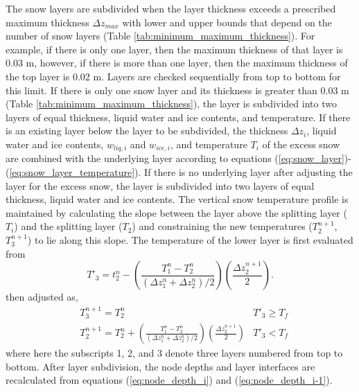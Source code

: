 \documentclass[12pt,authoryear]{elsarticle}
\numberwithin{equation}{section} %
\begin{document}
%
The snow layers are subdivided when the layer thickness exceeds a prescribed maximum thickness $\Delta z_{max}$ with lower and upper bounds that depend on the number of snow layers (Table \ref{tab:minimum_maximum_thickness}). For example, if there is only one layer, then the maximum thickness of that layer is 0.03 m, however, if there is more than one layer, then the maximum thickness of the top layer is 0.02 m. Layers are checked sequentially from top to bottom for this limit. If there is only one snow layer and its thickness is greater than 0.03 m (Table \ref{tab:minimum_maximum_thickness}), the layer is subdivided into two layers of equal thickness, liquid water and ice contents, and temperature. If there is an existing layer below the layer to be subdivided, the thickness $\Delta z_{i}$, liquid water and ice contents, $w_{liq,i}$ and $w_{ice,i}$, and temperature $T_{i}$ of the excess snow are combined with the underlying layer according to equations (\ref{eq:snow_layer})-(\ref{eq:snow_layer_temperature}). If there is no underlying layer after adjusting the layer for the excess snow, the layer is subdivided into two layers of equal thickness, liquid water and ice contents. The vertical snow temperature profile is maintained by calculating the slope between the layer above the splitting layer ($T_{i}$) and the splitting layer ($T_{2}$) and constraining the new temperatures ($T_{2}^{n+1}$, $T_{3}^{n+1}$) to lie along this slope. The temperature of the lower layer is first evaluated from 
\begin{equation}
T'_{3} = t_{2}^{n}-\left(\frac{T_{1}^{n}-T_{2}^{n}}{(\Delta z_{1}^{n}+\Delta z_{2}^{n})/2}\right)\left(\frac{\Delta z_{2}^{n+1}}{2}\right).
\end{equation}
then adjusted as,
\begin{equation}
\begin{aligned}
&T_{3}^{n+1} = T_{2}^{n} & T'_{3} \geq T_{f}\\
&T_{2}^{n+1} = T_{2}^{n} + \left(\frac{T_{1}^{n}-T_{2}^{n}}{(\Delta z_{1}^{n}+\Delta z_{2}^{n})/2}\right)\left(\frac{\Delta z_{2}^{n+1}}{2}\right) & T'_{3} < T_{f}
\end{aligned}
\end{equation}
where here the subscripts 1, 2, and 3 denote three layers numbered from top to bottom. After layer subdivision, the node depths and layer interfaces are recalculated from equations (\ref{eq:node_depth_i}) and (\ref{eq:node_depth_i-1}).
\end{document}
